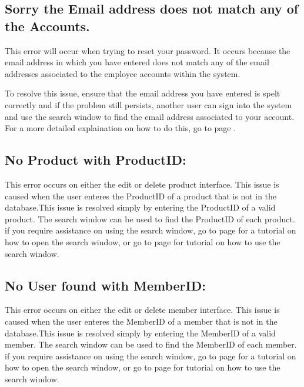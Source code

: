 \subsection{Sorry the Email address does not match any of the Accounts.}

This error will occur when trying to reset your password. It occurs because the email address in which you have entered does not match any of the email addresses associated to the employee accounts within the system.

To resolve this issue, ensure that the email address you have entered is spelt correctly and if the problem still persists, another user can sign into the system and use the search window to find the email address associated to your account. For a more detailed explaination on how to do this, go to page \pageref{fig:Using the search window}.

\subsection{No Product with ProductID:}

This error occurs on either the edit or delete product interface. This issue is caused when the user enteres the ProductID of a product that is not in the database.This issue is resolved simply by entering the ProductID of a valid product. The search window can be used to find the ProductID of each product. if you require assistance on using the search window, go to page \pageref{fig:Accessing the search window} for a tutorial on how to open the search window, or go to page \pageref{fig:Using the search window} for tutorial on how to use the search window.

\subsection{No User found with MemberID:}

This error occurs on either the edit or delete member interface. This issue is caused when the user enteres the MemberID of a member that is not in the database.This issue is resolved simply by entering the MemberID of a valid member. The search window can be used to find the MemberID of each member. if you require assistance on using the search window, go to page \pageref{fig:Accessing the search window} for a tutorial on how to open the search window, or go to page \pageref{fig:Using the search window} for tutorial on how to use the search window.

